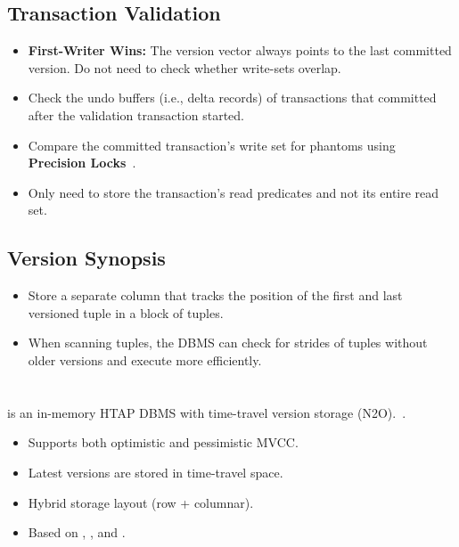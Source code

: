 \documentclass[11pt]{article}
\begin{document}
\subsection*{Transaction Validation}
\begin{itemize}
    \item \textbf{First-Writer Wins:}
    The version vector always points to the last committed version. Do not 
    need to check whether write-sets overlap.
    
    \item 
    Check the undo buffers (i.e., delta records) of transactions that committed after the 
    validation transaction started.
    
    \item
    Compare the committed transaction's write set for phantoms using \textbf{Precision 
    Locks}~\cite{jordan81}.
    
    \item
    Only need to store the transaction's read predicates and not its entire read set.
\end{itemize}

\subsection*{Version Synopsis}
\begin{itemize}
    \item
    Store a separate column that tracks the position of the first and last versioned tuple in 
    a block of tuples.

    \item
    When scanning tuples, the DBMS can check for strides of tuples without older versions and 
    execute more efficiently.
\end{itemize}


\section{}
 is an in-memory HTAP DBMS with time-travel version storage (N2O).~\cite{farber2012sap}.
\begin{itemize}
    \item Supports both optimistic and pessimistic MVCC.
    \item Latest versions are stored in time-travel space.
    \item Hybrid storage layout (row + columnar).
    \item Based on , , and .
\end{itemize}
\end{document}

